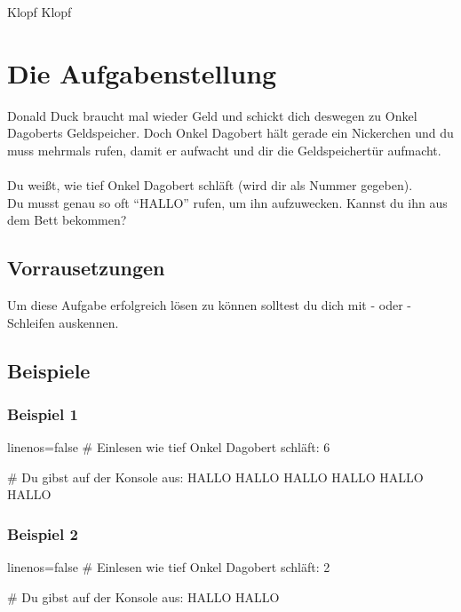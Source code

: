 \documentclass{\VorlagenPfad/coderdojokatext}
\newcommand{\Titel}{Klopf Klopf}
\begin{document}
	\setcounter{chapter}{1}
	
	\begin{center}
		{\huge \Titel}
	\end{center}
	
	\section{Die Aufgabenstellung} Donald Duck braucht mal wieder Geld und schickt dich deswegen zu Onkel Dagoberts Geldspeicher. Doch Onkel Dagobert hält gerade ein Nickerchen und du muss mehrmals rufen, damit er aufwacht und dir die Geldspeichertür aufmacht.
	\\ \\
	Du weißt, wie tief Onkel Dagobert schläft (wird dir als Nummer gegeben). \\
	Du musst genau so oft "`HALLO"' rufen, um ihn aufzuwecken.
	Kannst du ihn aus dem Bett bekommen?
	
	\subsection{Vorrausetzungen} Um diese Aufgabe erfolgreich lösen zu können solltest du dich mit - oder -Schleifen auskennen.
	
\subsection{Beispiele}
\subsubsection{Beispiel 1}
\begin{pseudocode*}{linenos=false}
# Einlesen wie tief Onkel Dagobert schläft:
6

# Du gibst auf der Konsole aus:
HALLO
HALLO
HALLO
HALLO
HALLO
HALLO

\end{pseudocode*}
	
\subsubsection{Beispiel 2}

\begin{pseudocode*}{linenos=false}
# Einlesen wie tief Onkel Dagobert schläft:
2

# Du gibst auf der Konsole aus:
HALLO
HALLO
\end{pseudocode*}	
\end{document}
